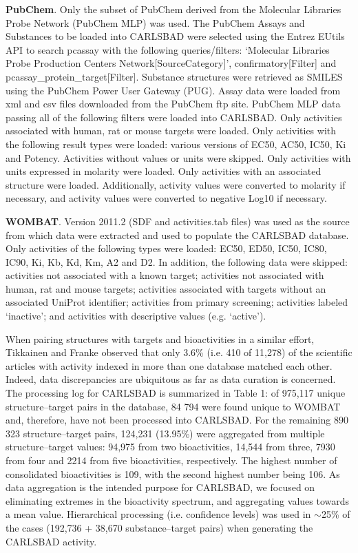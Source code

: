 \textbf{PubChem}. Only the subset of PubChem derived from the Molecular Libraries Probe Network (PubChem MLP) was used. The PubChem Assays and Substances to be loaded into CARLSBAD were selected using the Entrez EUtils API to search pcassay with the following queries/filters: ‘Molecular Libraries Probe Production Centers Network[SourceCategory]’, confirmatory[Filter] and pcassay\_protein\_target[Filter]. Substance structures were retrieved as SMILES using the PubChem Power User Gateway (PUG). Assay data were loaded from xml and csv files downloaded from the PubChem ftp site. PubChem MLP data passing all of the following filters were loaded into CARLSBAD. Only activities associated with human, rat or mouse targets were loaded. Only activities with the following result types were loaded: various versions of EC50, AC50, IC50, Ki and Potency. Activities without values or units were skipped. Only activities with units expressed in molarity were loaded. Only activities with an associated structure were loaded. Additionally, activity values were converted to molarity if necessary, and activity values were converted to negative Log10 if necessary.

\textbf{WOMBAT}. Version 2011.2 (SDF and activities.tab files) was used as the source from which data were extracted and used to populate the CARLSBAD database. Only activities of the following types were loaded: EC50, ED50, IC50, IC80, IC90, Ki, Kb, Kd, Km, A2 and D2. In addition, the following data were skipped: activities not associated with a known target; activities not associated with human, rat and mouse targets; activities associated with targets without an associated UniProt identifier; activities from primary screening; activities labeled ‘inactive’; and activities with descriptive values (e.g. ‘active’).

When pairing structures with targets and bioactivities in a similar effort, Tikkainen and Franke observed that only 3.6\% (i.e. 410 of 11,278) of the scientific articles with activity indexed in more than one database matched each other. Indeed, data discrepancies are ubiquitous as far as data curation is concerned\cite{Tiikkainen2012-cw}. The processing log for CARLSBAD is summarized in Table 1: of 975,117 unique structure–target pairs in the database, 84 794 were found unique to WOMBAT and, therefore, have not been processed into CARLSBAD. For the remaining 890 323 structure–target pairs, 124,231 (13.95\%) were aggregated from multiple structure–target values: 94,975 from two bioactivities, 14,544 from three, 7930 from four and 2214 from five bioactivities, respectively. The highest number of consolidated bioactivities is 109, with the second highest number being 106. As data aggregation is the intended purpose for CARLSBAD, we focused on eliminating extremes in the bioactivity spectrum, and aggregating values towards a mean value. Hierarchical processing (i.e. confidence levels) was used in $\sim$25\% of the cases (192,736 + 38,670 substance–target pairs) when generating the CARLSBAD activity.

